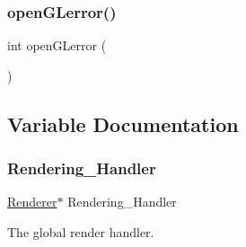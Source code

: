 \subsubsection{\texorpdfstring{open\+G\+Lerror()}{openGLerror()}}
{\footnotesize\ttfamily int open\+G\+Lerror (\begin{DoxyParamCaption}{ }\end{DoxyParamCaption})}



\subsection{Variable Documentation}
\mbox{\label{OpenGL-Wrappers_8hpp_a21679bfe3ff6515d046879b080ac8ca9}} 
\subsubsection{\texorpdfstring{Rendering\+\_\+\+Handler}{Rendering\_Handler}}
{\footnotesize\ttfamily \mbox{\hyperlink{classRenderer}{Renderer}}$\ast$ Rendering\+\_\+\+Handler}



The global render handler. 

